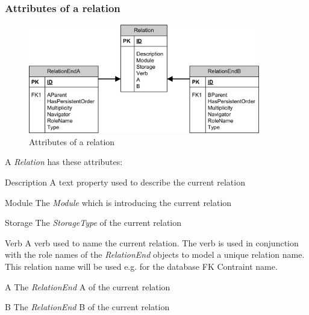\subsubsection{Attributes of a relation}

\begin{figure}[ht]
	\begin{center}
		\includegraphics[width=0.9\textwidth]{images/Rel_Attributes.png}
		\caption{Attributes of a relation}
		\label{attributes_of_a_relation}
	\end{center}
\end{figure}

A \emph{Relation} has these attributes:
\begin{descriptionBorder}
	\item[Description] 	{ A text property used to describe the current relation }
	\item[Module] 		{ The \emph{Module} which is introducing the current relation }
	\item[Storage] 		{ The \emph{StorageType} of the current relation }
	\item[Verb] 		{ 	A verb used to name the current relation. 
							The verb is used in conjunction with the role names of the \emph{RelationEnd} objects to model a unique relation name. 
							This relation name will be used e.g. for the database FK Contraint name.}
	\item[A] 			{ The \emph{RelationEnd} A of the current relation }
	\item[B] 			{ The \emph{RelationEnd} B of the current relation }
\end{descriptionBorder}


